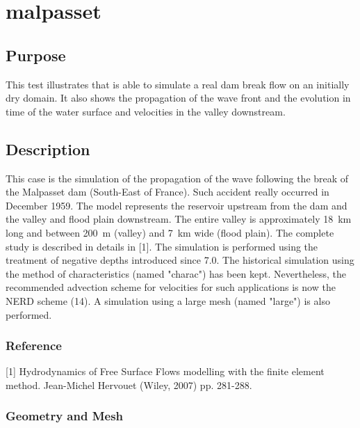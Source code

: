 \chapter{malpasset}
%
%
\section{Purpose}
%
This test illustrates that  is able to simulate a real dam
break flow on an initially dry domain.
It also shows the propagation of the wave front and the evolution in
time of the water surface and velocities in the valley downstream.
%
\section{Description}
%
This case is the simulation of the propagation of the wave following
the break of the Malpasset dam (South-East of France).
Such accident really occurred in December 1959.
The model represents the reservoir upstream from the dam and the valley
and flood plain downstream.
The entire valley is approximately 18~km long and between 200~m (valley)
and 7~km wide (flood plain).
The complete study is described in details in [1].
The simulation is performed using the treatment of negative depths
introduced since  7.0.
The historical simulation using the method of characteristics
(named "charac") has been kept.
Nevertheless, the recommended advection scheme for velocities for such
applications is now the NERD scheme (14).
A simulation using a large mesh (named "large") is also performed.
%
%
%
%
\subsection{Reference}
%
[1] Hydrodynamics of Free Surface Flows modelling with the finite
element method. Jean-Michel Hervouet (Wiley, 2007) pp. 281-288.
%
%
%
\subsection{Geometry and Mesh}
%
